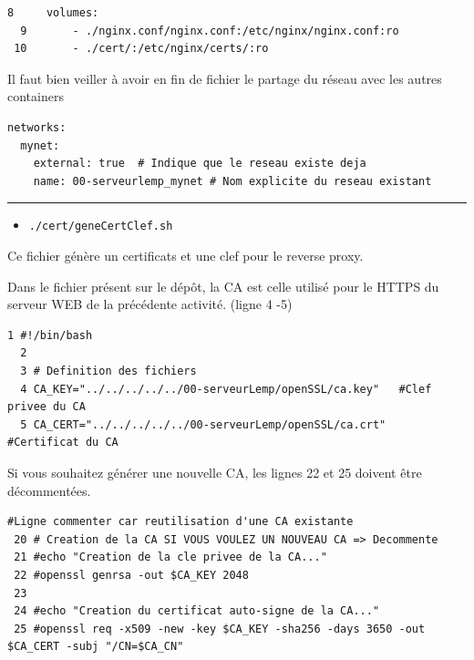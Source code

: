 \documentclass[french, 12pt]{article}%
\newcommand{\itemE}{\item[$\bullet$]}
\begin{document}
\begin{lstlisting}[style = commande]
  8     volumes:
  9       - ./nginx.conf/nginx.conf:/etc/nginx/nginx.conf:ro
 10       - ./cert/:/etc/nginx/certs/:ro
\end{lstlisting}


Il faut bien veiller à avoir en fin de fichier le partage du réseau avec les autres containers 

\begin{lstlisting}[style = commande]
networks:
  mynet:
    external: true  # Indique que le reseau existe deja
    name: 00-serveurlemp_mynet # Nom explicite du reseau existant
\end{lstlisting}



\begin{center}
 \rule{0.75\linewidth}{1pt}
 \end{center}


\begin{itemize}
\itemE \verb?./cert/geneCertClef.sh?
\end{itemize}
Ce fichier génère un certificats et une clef pour le reverse proxy.

Dans le fichier présent sur le dépôt, la CA est celle utilisé pour le HTTPS du serveur WEB de la précédente activité.	(ligne 4 -5)

\begin{lstlisting}[style = commande]
  1 #!/bin/bash                                                                                                                                                                               
  2 
  3 # Definition des fichiers
  4 CA_KEY="../../../../../00-serveurLemp/openSSL/ca.key"   #Clef privee du CA
  5 CA_CERT="../../../../../00-serveurLemp/openSSL/ca.crt"  #Certificat du CA

\end{lstlisting}

Si vous souhaitez générer une nouvelle CA, les lignes 22 et 25 doivent être décommentées.

\begin{lstlisting}[style = commande]
#Ligne commenter car reutilisation d'une CA existante
 20 # Creation de la CA SI VOUS VOULEZ UN NOUVEAU CA => Decommente
 21 #echo "Creation de la cle privee de la CA..."
 22 #openssl genrsa -out $CA_KEY 2048
 23 
 24 #echo "Creation du certificat auto-signe de la CA..."
 25 #openssl req -x509 -new -key $CA_KEY -sha256 -days 3650 -out $CA_CERT -subj "/CN=$CA_CN"
\end{lstlisting}
\end{document}
